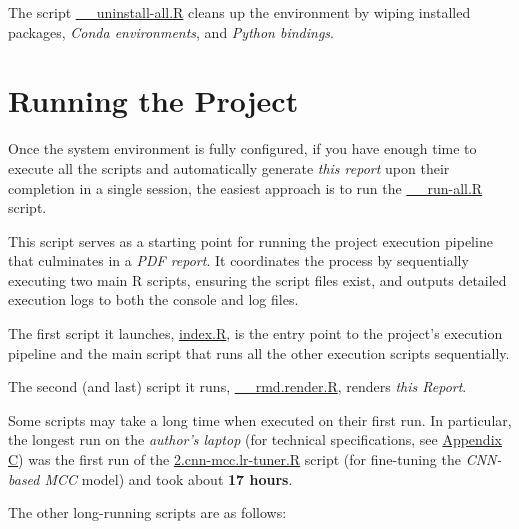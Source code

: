 \documentclass[
]{report}
\begin{document}
The script \href{https://github.com/AzKurban-edX-DS/edx.capstone.choose-your-own/blob/main/r/support-scripts/setup-env/__uninstall-all.R}{\_\_uninstall-all.R} cleans up the environment by wiping installed packages, \emph{Conda environments}, and \emph{Python bindings}.

\section{Running the Project}\label{running-the-project}

Once the system environment is fully configured, if you have enough time to execute all the scripts and automatically generate \emph{this report} upon their completion in a single session, the easiest approach is to run the \href{https://github.com/AzKurban-edX-DS/edx.capstone.choose-your-own/blob/main/r/support-scripts/__run-all.R}{\_\_run-all.R} script.

This script serves as a starting point for running the project execution pipeline that culminates in a \emph{PDF report}. It coordinates the process by sequentially executing two main R scripts, ensuring the script files exist, and outputs detailed execution logs to both the console and log files.

The first script it launches, \href{https://github.com/AzKurban-edX-DS/edx.capstone.choose-your-own/blob/main/r/index.R}{index.R}, is the entry point to the project's execution pipeline and the main script that runs all the other execution scripts sequentially.

The second (and last) script it runs, \href{https://github.com/AzKurban-edX-DS/edx.capstone.choose-your-own/blob/main/r/support-scripts/__rmd.render.R}{\_\_rmd.render.R}, renders \emph{this Report}.

\begin{warningblock}
Some scripts may take a long time when executed on their first run. In particular, the longest run on the \emph{author's laptop} (for technical specifications, see \hyperref[appndx_c]{Appendix C}) was the first run of the \href{https://github.com/AzKurban-edX-DS/edx.capstone.choose-your-own/blob/main/r/models/cnn/mcc/tuner/2.cnn-mcc.lr-tuner.R}{2.cnn-mcc.lr-tuner.R} script (for fine-tuning the \emph{CNN-based MCC} model) and took about \textbf{17 hours}.

\end{warningblock}

The other long-running scripts are as follows:
\end{document}
